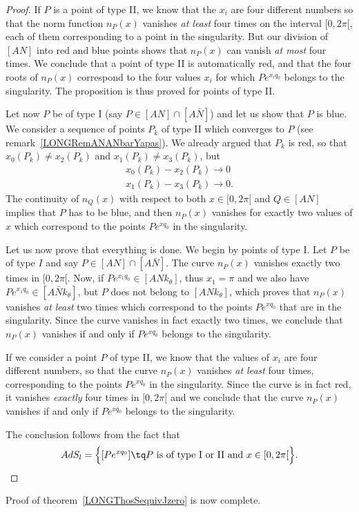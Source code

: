 \begin{proof}
	If $P$ is a point of type II, we know that the $x_i$ are four different numbers so that the norm function $n_P(x)$ vanishes \emph{at least} four times on the interval $\mathopen[ 0 , 2\pi [$, each of them corresponding to a point in the singularity. But our division of $[AN]$ into red and blue points shows that $n_P(x)$ can vanish \emph{at most} four times. We conclude that a point of type II is automatically red, and that the four roots of $n_P(x)$ correspond to the four values $x_i$ for which $P e^{x_iq_0}$ belongs to the singularity. The proposition is thus proved for points of type II.

	Let now $P$ be of type I (say $P\in [AN]\cap [A\bar N]$) and let us show that $P$ is blue. We consider a sequence of points $P_k$ of type II which converges to $P$ (see remark~\ref{LONGRemANANbarYapas}). We already argued that $P_k$ is red, so that $x_0(P_k)\neq x_2(P_k)$ and $x_1(P_k)\neq x_3(P_k)$, but
	\begin{subequations}
		\begin{align}
			x_0(P_k)-x_2(P_k)\to 0 \\
			x_1(P_k)-x_3(P_k)\to 0.
		\end{align}
	\end{subequations}
	The continuity of $n_Q(x)$ with respect to both $x\in\mathopen[ 0 , 2\pi [$ and $Q\in[AN]$ implies that $P$ has to be blue, and then $n_P(x)$ vanishes for exactly two values of $x$ which correspond to the points $P e^{xq_0}$ in the singularity.

	Let us now prove that everything is done. We begin by points of type I. Let $P$ be of type $I$ and say $P\in[AN]\cap[A\bar N]$. The curve $n_P(x)$ vanishes exactly two times in $\mathopen[ 0 , 2\pi [$. Now, if $P e^{x_1 q_0}\in[ANk_{\theta}]$, thus $x_1 = \pi$ and we also have $P e^{x_1q_0}\in[A\bar Nk_{\theta}]$, but $P$ does not belong to $[ANk_{\theta}]$, which proves that $n_P(x)$ vanishes \emph{at least} two times which correspond to the points $P e^{xq_0}$ that are in the singularity. Since the curve vanishes in fact exactly two times, we conclude that $n_P(x)$ vanishes if and only if $P e^{xq_0}$ belongs to the singularity.

	If we consider a point $P$ of type II, we know that the values of $x_i$ are four different numbers, so that the curve $n_P(x)$ vanishes \emph{at least} four times, corresponding to the points $P e^{xq_0}$ in the singularity. Since the curve is in fact red, it vanishes \emph{exactly} four times in $\mathopen[ 0 , 2\pi [$ and we conclude that the curve $n_P(x)$ vanishes if and only if $P e^{xq_0}$ belongs to the singularity.

	The conclusion follows from the fact that
	\begin{equation}
		AdS_l=\Big\{ [P e^{xq_0}] \tq P \text{ is of type I or II and  } x\in\mathopen[ 0 , 2\pi [ \Big\}.
	\end{equation}
\end{proof}
Proof of theorem~\ref{LONGThosSequivJzero} is now complete.



